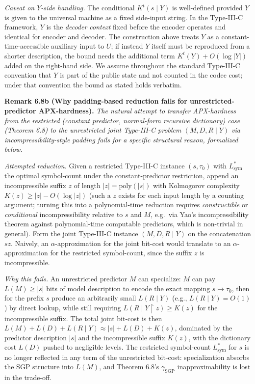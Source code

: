 \documentclass[
]{article}
\begin{document}
\emph{Caveat on $Y$-side handling.} The conditional $K^t(s \mid Y)$
is well-defined provided $Y$ is given to the universal machine as a
fixed side-input string. In the Type-III-C framework, $Y$ is the
\emph{decoder context} fixed before the encoder operates and
identical for encoder and decoder. The construction above treats $Y$
as a constant-time-accessible auxiliary input to $U$; if instead $Y$
itself must be reproduced from a shorter description, the bound
needs the additional term $K^t(Y) + O(\log |Y|)$ added on the
right-hand side. We assume throughout the standard Type-III-C
convention that $Y$ is part of the public state and not counted in
the codec cost; under that convention the bound as stated holds
verbatim.

\textbf{Remark 6.8b (Why padding-based reduction fails for
unrestricted-predictor APX-hardness).} \emph{The natural attempt
to transfer APX-hardness from the restricted (constant predictor,
normal-form recursive dictionary) case (Theorem 6.8) to the
\emph{unrestricted joint} Type-III-C problem $(M, D, R \mid Y)$ via
incompressibility-style padding fails for a specific structural
reason, formalized below.}

\emph{Attempted reduction.} Given a restricted Type-III-C instance
$(s, \tau_0)$ with $L_{\mathrm{sym}}^*$ the optimal symbol-count under
the constant-predictor restriction, append an incompressible suffix
$z$ of length $|z| = \mathrm{poly}(|s|)$ with Kolmogorov complexity
$K(z) \geq |z| - O(\log |z|)$ (such a $z$ exists for each input
length by a counting argument; turning this into a polynomial-time
reduction requires \emph{constructible} or \emph{conditional}
incompressibility relative to $s$ and $M$, e.g.\ via Yao's
incompressibility theorem against polynomial-time computable
predictors, which is non-trivial in general). Form the joint Type-III-C instance
$(M, D, R \mid Y)$ on the concatenation $s z$. Naively, an
$\alpha$-approximation for the joint bit-cost would translate to an
$\alpha$-approximation for the restricted symbol-count, since the
suffix $z$ is incompressible.

\emph{Why this fails.} An unrestricted predictor $M$ can specialize:
$M$ can pay $L(M) \geq |s|$ bits of model description to encode the
exact mapping $s \mapsto \tau_0$, then for the prefix $s$ produce an
arbitrarily small $L(R \mid Y)$ (e.g., $L(R \mid Y) = O(1)$) by
direct lookup, while still requiring $L(R \mid Y \restriction z) \geq
K(z)$ for the incompressible suffix. The total
joint bit-cost is then $L(M) + L(D) + L(R \mid Y) \approx |s| + L(D)
+ K(z)$, dominated by the predictor description $|s|$ and the
incompressible suffix $K(z)$, with the dictionary cost $L(D)$ pushed
to negligible levels. The restricted symbol-count
$L_{\mathrm{sym}}^*$ for $s$ is no longer reflected in any term of
the unrestricted bit-cost: specialization absorbs the SGP structure
into $L(M)$, and Theorem 6.8's $\gamma_{\mathrm{SGP}}$ inapproximability
is lost in the trade-off.
\end{document}
